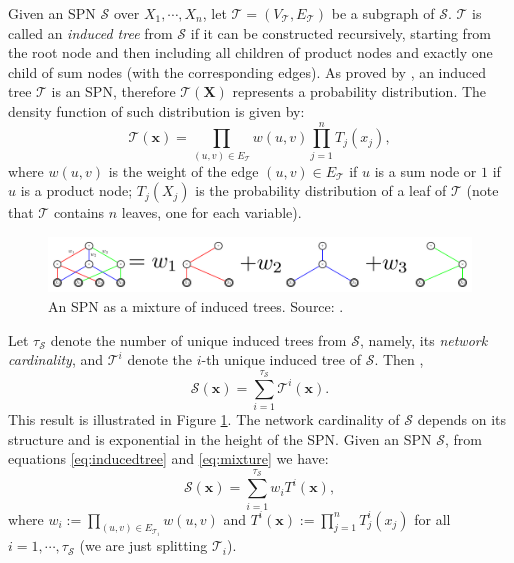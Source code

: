 \documentclass[12pt]{article}
\begin{document}
Given an SPN $\mathcal{S}$ over $X_1, \cdots, X_n$, let $\mathcal{T} = (V_\mathcal{T}, E_\mathcal{T})$ be a subgraph of $\mathcal{S}$. $\mathcal{T}$ is called an \emph{induced tree}
from $\mathcal{S}$ if it can be constructed recursively, starting from the root node and then including all children of product nodes and exactly one child of sum nodes (with the corresponding edges). As proved by \cite{Zhao2016}, an induced tree $\mathcal{T}$ is an SPN, therefore $\mathcal{T}(\mathbf{X})$ represents a probability distribution. The density function of such distribution is given by:
\begin{equation}
  \mathcal{T}(\mathbf{x}) = \prod_{(u, v) \in E_\mathcal{T}} w(u, v) \prod_{j=1}^{n} T_j(x_j),
  \label{eq:inducedtree}
\end{equation}
where $w(u, v)$ is the weight of the edge $(u, v) \in E_\mathcal{T}$ if $u$ is a sum node or $1$ if $u$ is a product node; $T_j(X_j)$ is the probability distribution of a leaf of $\mathcal{T}$ (note that $\mathcal{T}$ contains $n$ leaves, one for each variable).

\begin{figure}
  \includegraphics[width=\textwidth]{figures/inducedtrees.pdf}

  \caption{An SPN as a mixture of induced trees. Source: \cite{Zhao2016}.}
  \label{fig:inducedtrees}
\end{figure}

Let $\tau_\mathcal{S}$ denote the number of unique induced trees from $\mathcal{S}$, namely, its \emph{network cardinality}, and $\mathcal{T}^i$ denote the $i$-th unique induced tree of $\mathcal{S}$. Then \cite{Zhao2016},
\begin{equation}
  \mathcal{S}(\mathbf{x}) = \sum_{i=1}^{\tau_\mathcal{S}} \mathcal{T}^i(\mathbf{x}).
  \label{eq:mixture}
\end{equation}
This result is illustrated in Figure \ref{fig:inducedtrees}. The network cardinality of $\mathcal{S}$ depends on its structure and is exponential in the height of the SPN.
Given an SPN $\mathcal{S}$, from equations \ref{eq:inducedtree} and \ref{eq:mixture} we have:
\begin{equation}
  \mathcal{S}(\mathbf{x}) = \sum_{i=1}^{\tau_\mathcal{S}} w_i T^i(\textbf{x}),
\end{equation}
where $w_i := \prod_{(u, v) \in E_{\mathcal{T}_i}} w(u, v)$ and $T^i(\mathbf{x}) := \prod_{j=1}^n T^i_j(x_j)$ for all $i = 1, \cdots, \tau_\mathcal{S}$ (we are just splitting $\mathcal{T}_i$).
\end{document}

